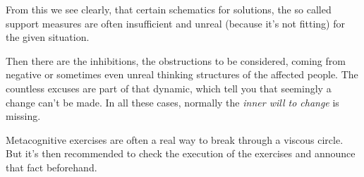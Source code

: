 \documentclass[../main.tex]{subfiles}
\begin{document}
From this we see clearly, that certain schematics for solutions, the so called support measures %
are often insufficient and unreal (because it's not fitting) for the given situation.

Then there are the inhibitions, the {obstructions} to be considered, coming from negative or sometimes even unreal thinking structures of the affected people.
The countless  excuses are part of that dynamic, which tell you that seemingly a change can't be made. In all these cases,
normally the \emph{inner will to change} is missing.

Metacognitive exercises are often a real way to break through a {viscous circle}.
But it's then recommended to check the execution of the exercises and announce that fact beforehand. 
\end{document}
